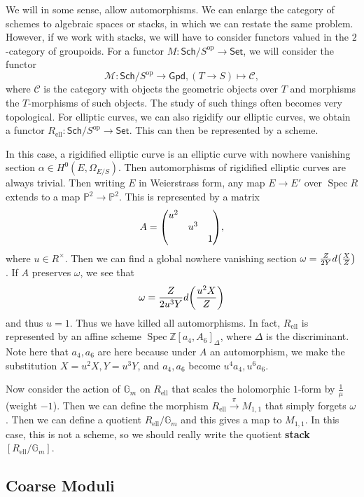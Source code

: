 \documentclass[leqno, openany]{memoir}
\theoremstyle{definition}
\theoremstyle{remark}
\theoremstyle{plain}
\theoremstyle{definition}
\theoremstyle{remark}
\newcommand{\G}{\mathbb{G}}
\newcommand{\Z}{\mathbb{Z}}
\renewcommand{\P}{\mathbb{P}}
\newcommand{\mc}[1]{\mathcal{#1}}
\newcommand{\mr}[1]{\mathrm{#1}}
\newcommand{\ms}[1]{\mathsf{#1}}
\DeclareMathOperator{\Spec}{Spec}
\begin{document}
    We will in some sense, allow automorphisms. We can enlarge the category of schemes to algebraic spaces or stacks, in which we can restate the same problem. However, if we work with stacks, we will have to consider functors valued in the $2$-category of groupoids. For a functor $M \colon \ms{Sch}/S^{\mr{op}} \to \ms{Set}$, we will consider the functor
        \[ \mc{M} \colon \ms{Sch}/S^{\mr{op}} \to \ms{Gpd}, (T \to S ) \mapsto \mc{C}, \]
        where $\mc{C}$ is the category with objects the geometric objects over $T$ and morphisms the $T$-morphisms of such objects. The study of such things often becomes very topological. For elliptic curves, we can also rigidify our elliptic curves, we obtain a functor $R_{\mr{ell}} \colon \ms{Sch}/S^{\mr{op}} \to \ms{Set}$. This can then be represented by a scheme.

        In this case, a rigidified elliptic curve is an elliptic curve with nowhere vanishing section $\alpha \in H^0(E, \Omega_{E/S})$. Then automorphisms of rigidified elliptic curves are always trivial. Then writing $E$ in Weierstrass form, any map $E \to E'$ over $\Spec R$ extends to a map $\P^2 \to \P^2$. This is represented by a matrix 
        \[ A = \mqty(\dmat{u^2, u^3, 1}), \]
        where $u \in R^{\times}$. Then we can find a global nowhere vanishing section $\omega = \frac{Z}{2Y} d\qty(\frac{X}{Z})$. If $A$ preserves $\omega$, we see that
        \[ \omega = \frac{Z}{2u^3Y} d\qty(\frac{u^2X}{Z}) \]
        and thus $u = 1$. Thus we have killed all automorphisms. In fact, $R_{\mr{ell}}$ is represented by an affine scheme $\Spec \Z[a_4, A_6]_{\Delta}$, where $\Delta$ is the discriminant. Note here that $a_4, a_6$ are here because under $A$ an automorphism, we make the substitution $X = u^2 X, Y = u^3Y$, and $a_4, a_6$ become $u^4 a_4, u^6 a_6$. 
        
        Now consider the action of $\G_m$ on $R_{\mr{ell}}$ that scales the holomorphic $1$-form by $\frac{1}{\mu}$ (weight $-1$). Then we can define the morphism $R_{\mr{ell}} \xrightarrow{\pi} M_{1,1}$ that simply forgets $\omega$. Then we can define a quotient $R_{\mr{ell}} / \G_m$ and this gives a map to $M_{1,1}$. In this case, this is not a scheme, so we should really write the quotient \textbf{stack} $[R_{\mr{ell}} / \G_m]$.

    \subsection{Coarse Moduli}%
    \label{sub:coarse_moduli}
    
\end{document}
